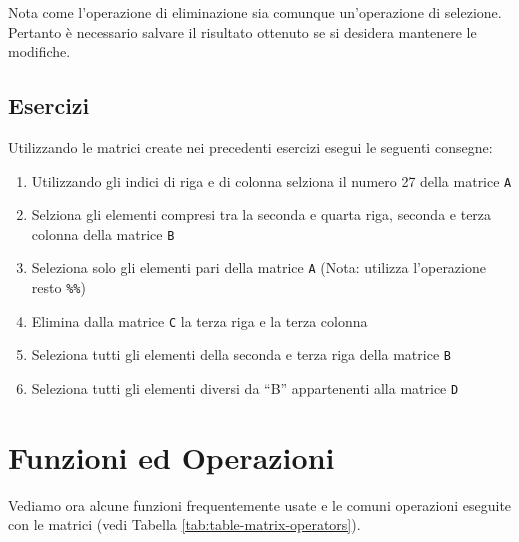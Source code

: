 \documentclass[
]{book}
\providecommand{\tightlist}{%
  \setlength{\itemsep}{0pt}\setlength{\parskip}{0pt}}
\begin{document}
Nota come l'operazione di eliminazione sia comunque un'operazione di selezione. Pertanto è necessario salvare il risultato ottenuto se si desidera mantenere le modifiche.

\hypertarget{esercizi-7}{%
\subsection*{Esercizi}\label{esercizi-7}}

Utilizzando le matrici create nei precedenti esercizi esegui le seguenti consegne:

\begin{enumerate}
\def\labelenumi{\arabic{enumi}.}
\tightlist
\item
  Utilizzando gli indici di riga e di colonna selziona il numero 27 della matrice \texttt{A}
\item
  Selziona gli elementi compresi tra la seconda e quarta riga, seconda e terza colonna della matrice \texttt{B}
\item
  Seleziona solo gli elementi pari della matrice \texttt{A} (Nota: utilizza l'operazione resto \texttt{\%\%})
\item
  Elimina dalla matrice \texttt{C} la terza riga e la terza colonna
\item
  Seleziona tutti gli elementi della seconda e terza riga della matrice \texttt{B}
\item
  Seleziona tutti gli elementi diversi da ``B'' appartenenti alla matrice \texttt{D}
\end{enumerate}

\hypertarget{funzioni-ed-operazioni}{%
\section{Funzioni ed Operazioni}\label{funzioni-ed-operazioni}}

Vediamo ora alcune funzioni frequentemente usate e le comuni operazioni eseguite con le matrici (vedi Tabella \ref{tab:table-matrix-operators}).
\end{document}
